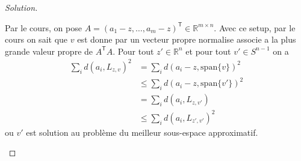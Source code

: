 \documentclass[a4paper,12pt,french]{report}
\theoremstyle{plain}
\theoremstyle{definition}
\begin{document}
\begin{proof}[Solution]
\begin{enumerate}
Par le cours, on pose $A=(a_{1}-z, \dots , a_{m}-z)^{\mathsf{T}}\in \mathbb{R}^{m\times n}$. Avec ce setup, par le cours on sait que $v$ est donne par un vecteur propre normalise associe a la plus grande valeur propre de $A^{\mathsf{T}}A$.  Pour tout $z'\in \mathbb{R}^{n}$ et pour tout $v'\in S^{n-1}$ on a
\begin{align*}
\sum _{i}d(a_{i},L_{z,v})^{2} & =\sum _{i}d(a_{i}-z,\mathrm{span}\{ v \})^{2}  \\
 & \le \sum _{i}d(a_{i}-z,\mathrm{span}\{ v' \})^{2} \\
 & =\sum _{i}d(a_{i},L_{z,v'}) \\
 & \le \sum _{i}d(a_{i},L_{z',v'})^{2}
\end{align*}
ou $v'$ est solution au problème du meilleur sous-espace approximatif.
\end{enumerate}
\end{proof}
\end{document}
